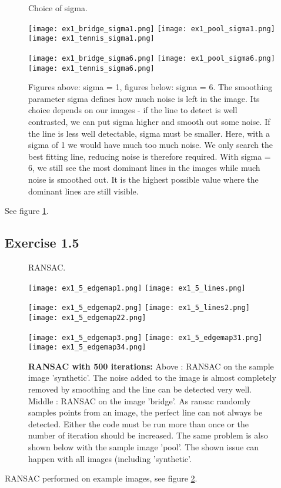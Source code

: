 \documentclass[a4paper,8pt]{extarticle}
\begin{document}
\begin{figure}
  \caption{Choice of sigma.}
  \centering
    \texttt{[image: ex1\_bridge\_sigma1.png]}
    \texttt{[image: ex1\_pool\_sigma1.png]}
    \texttt{[image: ex1\_tennis\_sigma1.png]}
    
    \texttt{[image: ex1\_bridge\_sigma6.png]}
    \texttt{[image: ex1\_pool\_sigma6.png]}
    \texttt{[image: ex1\_tennis\_sigma6.png]}

  \label{fig:sigma}
  \caption{Figures above: sigma = 1, figures below: sigma = 6. The smoothing parameter sigma defines how much noise is left in the image. Its choice depends on our images - if the line to detect is well contrasted, we can put sigma higher and smooth out some noise. If the line is less well detectable, sigma must be smaller. Here, with a sigma of 1 we would have much too much noise. We only search the best fitting line, reducing noise is therefore required. With sigma = 6, we still see the most dominant lines in the images while much noise is smoothed out. It is the highest possible value where the dominant lines are still visible.}
\end{figure}
See figure \ref{fig:sigma}.


\subsection{Exercise 1.5}

\begin{figure}
  \caption{RANSAC.}
  \centering
    \texttt{[image: ex1\_5\_edgemap1.png]}
    \texttt{[image: ex1\_5\_lines.png]}
    
    \texttt{[image: ex1\_5\_edgemap2.png]}   
    \texttt{[image: ex1\_5\_lines2.png]}
    \texttt{[image: ex1\_5\_edgemap22.png]}

    \texttt{[image: ex1\_5\_edgemap3.png]}   
    \texttt{[image: ex1\_5\_edgemap31.png]}
    \texttt{[image: ex1\_5\_edgemap34.png]}
    
  \label{fig:ransac}
  \caption{\textbf{RANSAC with 500 iterations:} Above : RANSAC on the sample image 'synthetic'. The noise added to the image is almost completely removed by smoothing and the line can be detected very well. Middle : RANSAC on the image 'bridge'. As ransac randomly samples points from an image, the perfect line can not always be detected. Either the code must be run more than once or the number of iteration should be increased. The same problem is also shown below with the sample image 'pool'. The shown issue can happen with all images (including 'synthetic'.}
\end{figure}
RANSAC performed on example images, see figure \ref{fig:ransac}.




\end{document}
